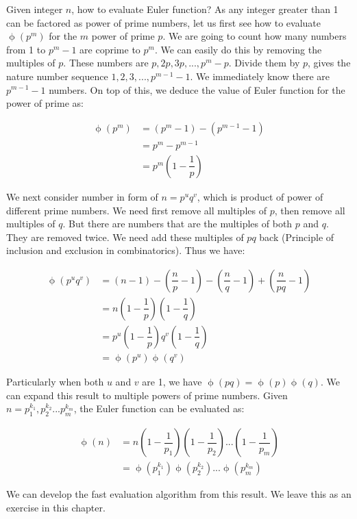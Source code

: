 \documentclass[b5paper]{article}
\begin{document}
Given integer $n$, how to evaluate Euler function? As any integer greater than 1 can be factored as power of prime numbers, let us first see how to evaluate $\upphi(p^m)$ for the $m$ power of prime $p$. We are going to count how many numbers from 1 to $p^m - 1$ are coprime to $p^m$. We can easily do this by removing the multiples of $p$. These numbers are $p, 2p, 3p, ..., p^m - p$. Divide them by $p$, gives the nature number sequence $1, 2, 3, ..., p^{m-1} - 1$. We immediately know there are $p^{m-1} - 1$ numbers. On top of this, we deduce the value of Euler function for the power of prime as:

\begin{align*}
\upphi(p^m) &= (p^m - 1) - (p^{m-1} - 1) \\
            &= p^m - p^{m-1} \\
            &= p^m(1-\dfrac{1}{p})
\end{align*}

We next consider number in form of $n = p^uq^v$, which is product of power of different prime numbers. We need first remove all multiples of $p$, then remove all multiples of $q$. But there are numbers that are the multiples of both $p$ and $q$. They are removed twice. We need add these multiples of $pq$ back (Principle of inclusion and exclusion in combinatorics). Thus we have:

\begin{align*}
\upphi(p^uq^v) &=  (n - 1) - (\dfrac{n}{p} - 1) - (\dfrac{n}{q} - 1) + (\dfrac{n}{pq} - 1) \\
          &=  n(1 - \dfrac{1}{p})(1 - \dfrac{1}{q}) \\[5pt]
          &=  p^u(1 - \dfrac{1}{p})q^v(1 - \dfrac{1}{q}) \\[5pt]
          &=  \upphi(p^u)\upphi(q^v)
\end{align*}

Particularly when both $u$ and $v$ are 1, we have $\upphi(pq) = \upphi(p)\upphi(q)$. We can expand this result to multiple powers of prime numbers. Given $n = p_1^{k_1}, p_2^{k_2}...p_m^{k_m}$, the Euler function can be evaluated as:

\begin{align*}
\upphi(n) &= n(1-\dfrac{1}{p_1})(1-\dfrac{1}{p_2})...(1-\dfrac{1}{p_m}) \\[5pt]
    &= \upphi(p_1^{k_1})\upphi(p_2^{k_2})...\upphi(p_m^{k_m})
\end{align*}

We can develop the fast evaluation algorithm from this result. We leave this as an exercise in this chapter.
\end{document}
